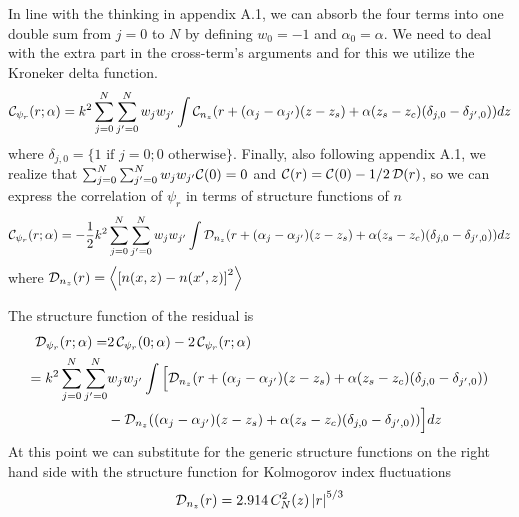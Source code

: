 \documentclass[11pt, oneside]{article}   	%
\begin{document}
In line with the thinking in appendix A.1, we can absorb the four terms into one double sum from $j=0$ to $N$ by defining $w_0 = -1$ and $\alpha_0 = \alpha$. We need to deal with the extra part in the cross-term's arguments and for this we utilize the Kroneker delta function.
\begin{equation}
{\cal C}_{\psi_r}(r;\alpha) = k^2 \sum_{j=0}^N \sum_{j'=0}^N 
                              w_j w_{j'}  \int  {\cal C}_{n_z}(r+(\alpha_j-\alpha_{j'})(z-z_s) + \alpha(z_s-z_c)(\delta_{j,0}-\delta_{j',0})) dz
\end{equation}
where $\delta_{j,0} = \{ 1 \text{ if } j=0; 0 \text{ otherwise}\}$. Finally, also following appendix A.1, we realize that
$\sum_{j=0}^N \sum_{j'=0}^N w_j w_{j'}  {\cal C}(0) = 0$ and ${\cal C}(r) = {\cal C}(0)-1/2\,{\cal D}(r)$, so we can express the correlation of $\psi_r$ in terms of structure functions of $n$
\begin{equation}
{\cal C}_{\psi_r}(r;\alpha) = -\frac{1}{2} k^2 \sum_{j=0}^N \sum_{j'=0}^N 
                              w_j w_{j'}  \int  {\cal D}_{n_z}(r+(\alpha_j-\alpha_{j'})(z-z_s) + \alpha(z_s-z_c)(\delta_{j,0}-\delta_{j',0})) dz
\end{equation}
where ${\cal D}_{n_z}(r) = \left\langle \left[ n(x,z)-n(x',z) \right]^2\right\rangle$

The structure function of the residual is
\begin{align}
{\cal D}_{\psi_r}(r;\alpha) = &2\,{\cal C}_{\psi_r}(0;\alpha) - 2\,{\cal C}_{\psi_r}(r;\alpha) \nonumber \\
        = k^2 \sum_{j=0}^N \sum_{j'=0}^N 
       &w_j w_{j'}  \int  \Big[ {\cal D}_{n_z}(r+(\alpha_j-\alpha_{j'})(z-z_s) + \alpha(z_s-z_c)(\delta_{j,0}-\delta_{j',0})) \nonumber \\
                            & - {\cal D}_{n_z}((\alpha_j-\alpha_{j'})(z-z_s) + \alpha(z_s-z_c)(\delta_{j,0}-\delta_{j',0})) \Big] dz                            
\end{align}
At this point we can substitute for the generic structure functions on the right hand side with the structure function for Kolmogorov index fluctuations
\begin{equation}
{\cal D}_{n_z}(r) = 2.914\, C_N^2(z) \left| r \right|^{5/3}
\end{equation}
\end{document}
